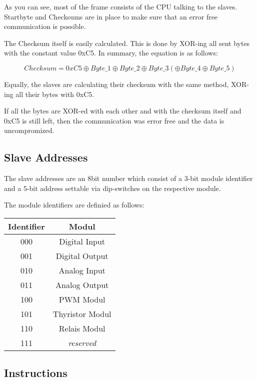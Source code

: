 As you can see, most of the frame consists of the CPU talking to the slaves. Startbyte and Checksums are in place to make sure that an error free communication is possible. 

The Checksum itself is easily calculated. This is done by XOR-ing all sent bytes with the constant value 0xC5. In summary, the equation is as follows:

\begin{equation}
    Checksum = 0xC5 \oplus Byte\_1 \oplus Byte\_2 \oplus Byte\_3 (\oplus Byte\_4 \oplus Byte\_5)
\end{equation}

Equally, the slaves are calculating their checksum with the same method, XOR-ing all their bytes with 0xC5. 

If all the bytes are XOR-ed with each other and with the checksum itself and 0xC5 is still left, then the communication was error free and the data is uncompromized.

\subsection{Slave Addresses}
The slave addresses are an 8bit number which consist of a 3-bit module identifier and a 5-bit address settable via dip-switches on the respective module.

The module identifiers are definied as follows:

\begin{table}[H]
    \centering
        \begin{tabular}{|c|c|}
            \hline
            Identifier & Modul \\ \hline \hline
            000 & Digital Input \\ \hline
            001 & Digital Output \\ \hline
            010 & Analog Input \\ \hline
            011 & Analog Output \\ \hline
            100 & PWM Modul \\ \hline
            101 & Thyristor Modul \\ \hline
            110 & Relais Modul \\ \hline
            111 & \textit{reserved}    \\ \hline
        \end{tabular}
\end{table}

\subsection{Instructions}

